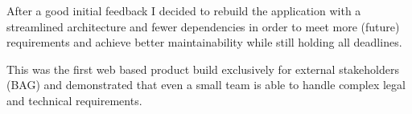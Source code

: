 \documentclass[9pt,a4paper]{altacv}
\begin{document}
\smallskip
After a good initial feedback I decided to rebuild the application with a streamlined architecture
and fewer dependencies in order to meet more (future) requirements and achieve better maintainability
while still holding all deadlines.

\smallskip
This was the first web based product build exclusively for external stakeholders (BAG) and demonstrated
that even a small team is able to handle complex legal and technical requirements.
\end{document}
